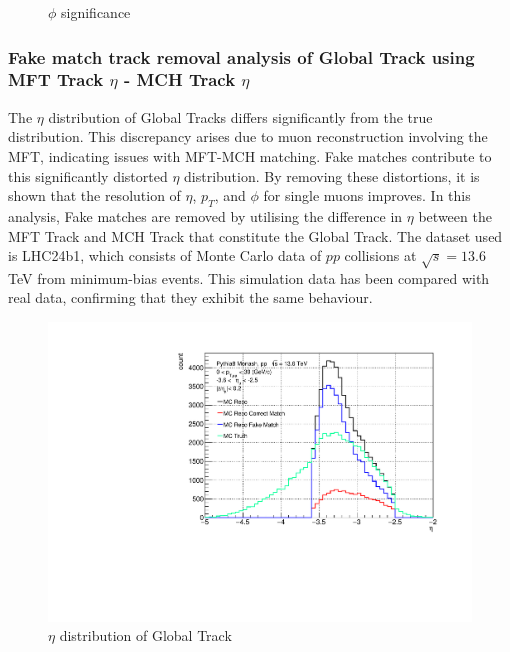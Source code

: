 \begin{figure}[htbp]
\begin{minipage}{0.45\textwidth}
                    \caption{$\phi$ significance}
                    \label{fig:phi_significance}
                \end{minipage}
            \end{figure}

        \subsubsection{Fake match track removal analysis of Global Track using MFT Track $\eta$ - MCH Track $\eta$}
        \label{Analysis:Matching}
            The \(\eta\) distribution of Global Tracks differs significantly from the true distribution. This discrepancy arises due to muon reconstruction involving the MFT, indicating issues with MFT-MCH matching. Fake matches contribute to this significantly distorted \(\eta\) distribution. By removing these distortions, it is shown that the resolution of \(\eta\), \(p_T\), and \(\phi\) for single muons improves. In this analysis, Fake matches are removed by utilising the difference in \(\eta\) between the MFT Track and MCH Track that constitute the Global Track. The dataset used is LHC24b1, which consists of Monte Carlo data of \(pp\) collisions at \(\sqrt{s} = 13.6\) TeV from minimum-bias events. This simulation data has been compared with real data, confirming that they exhibit the same behaviour. %
            \begin{figure}[H]
                \centering
                \includegraphics[keepaspectratio, scale=0.5]{fig/3_5_6_etacutno_eta.pdf}
                \caption{$\eta$ distribution of Global Track}
                \label{Analysis:Matching:eta}
            \end{figure}
